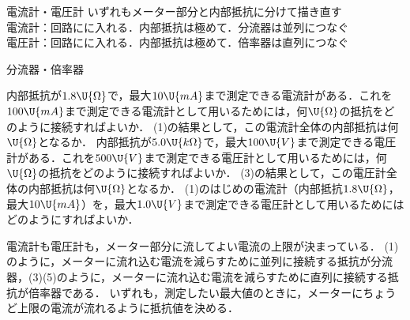 \bsNeed{34mm}
\begin{matome}{電流計・電圧計}
 \hspace{3mm} いずれも{\gtfamily メーター部分と内部抵抗}に分けて描き直す\\
 \hspace{3mm} 電流計：回路にに入れる．内部抵抗は極めて．\hspace{4mm}分流器は並列につなぐ\\
 \hspace{3mm} 電圧計：回路にに入れる．内部抵抗は極めて．\hspace{4mm}倍率器は直列につなぐ
\end{matome}

\bsNeed{56mm}
\begin{reidaiunit}
\begin{reidai}{分流器・倍率器}
\begin{komon}
 内部抵抗が$1.8\U{\Omega}$で，最大$10\U{mA}$まで測定できる電流計がある．これを$100\U{mA}$まで測定できる電流計として用いるためには，何$\U{\Omega}$の抵抗をどのように接続すればよいか．
 (1)の結果として，この電流計全体の内部抵抗は何$\U{\Omega}$となるか．
 内部抵抗が$5.0\U{k\Omega}$で，最大$100\U{V}$まで測定できる電圧計がある．これを$500\U{V}$まで測定できる電圧計として用いるためには，何$\U{\Omega}$の抵抗をどのように接続すればよいか．
 (3)の結果として，この電圧計全体の内部抵抗は何$\U{\Omega}$となるか．
 (1)のはじめの電流計（内部抵抗$1.8\U{\Omega}$，最大$10\U{mA}$）を，最大$1.0\U{V}$まで測定できる電圧計として用いるためにはどのようにすればよいか．
\end{komon}
\end{reidai}

\begin{sisinE}
電流計も電圧計も，メーター部分に流してよい電流の上限が決まっている．
(1)のように，メーターに流れ込む電流を減らすために並列に接続する抵抗が{\gtfamily 分流器}，(3)(5)のように，メーターに流れ込む電流を減らすために直列に接続する抵抗が{\gtfamily 倍率器}である．
いずれも，{\gtfamily 測定したい最大値のときに，メーターにちょうど上限の電流が流れる}ように抵抗値を決める．
\end{sisinE}



\end{reidaiunit}
